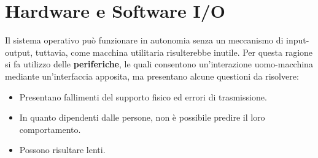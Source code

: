 \section{Hardware e Software I/O} %
Il sistema operativo può funzionare in autonomia senza un meccanismo di input-output, tuttavia, come macchina utilitaria risulterebbe inutile. Per
questa ragione si fa utilizzo delle \textbf{periferiche}, le quali consentono un'interazione uomo-macchina mediante un'interfaccia apposita, ma
presentano alcune questioni da risolvere: \begin{itemize}
    \item Presentano fallimenti del supporto fisico ed errori di trasmissione.
    \item In quanto dipendenti dalle persone, non è possibile predire il loro comportamento.
    \item Possono risultare lenti.
\end{itemize}

